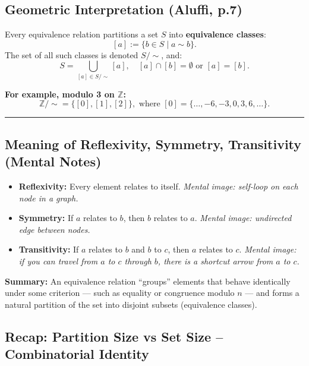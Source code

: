 \documentclass[10pt]{article}
\theoremstyle{plain}
\theoremstyle{definition}
\begin{document}
	\subsection*{Geometric Interpretation (Aluffi, p.7)}
	Every equivalence relation partitions a set $S$ into \textbf{equivalence classes}:
	\[
	[a] := \{ b \in S \mid a \sim b \}.
	\]
	The set of all such classes is denoted $S/{\sim}$, and:
	\[
	S = \bigcup_{[a] \in S/{\sim}} [a], \quad [a] \cap [b] = \emptyset \text{ or } [a] = [b].
	\]
	
	\textbf{For example, modulo 3 on $\mathbb{Z}$:}
	\[
	\mathbb{Z}/{\sim} = \{ [0], [1], [2] \}, \text{ where } [0] = \{ \ldots, -6, -3, 0, 3, 6, \ldots \}.
	\]
	
	\vspace{0.5em}
	\hrule
	\vspace{0.5em}
	
	\subsection*{Meaning of Reflexivity, Symmetry, Transitivity (Mental Notes)}
	
	\begin{itemize}
		\item \textbf{Reflexivity:} Every element relates to itself.  
		\textit{Mental image: self-loop on each node in a graph.}
		
		\item \textbf{Symmetry:} If $a$ relates to $b$, then $b$ relates to $a$.  
		\textit{Mental image: undirected edge between nodes.}
		
		\item \textbf{Transitivity:} If $a$ relates to $b$ and $b$ to $c$, then $a$ relates to $c$.  
		\textit{Mental image: if you can travel from $a$ to $c$ through $b$, there is a shortcut arrow from $a$ to $c$.}
	\end{itemize}
	
	\textbf{Summary:} An equivalence relation “groups” elements that behave identically under some criterion — such as equality or congruence modulo $n$ — and forms a natural partition of the set into disjoint subsets (equivalence classes).
	
	
	
	\subsection*{Recap: Partition Size vs Set Size – Combinatorial Identity}
	
\end{document}

